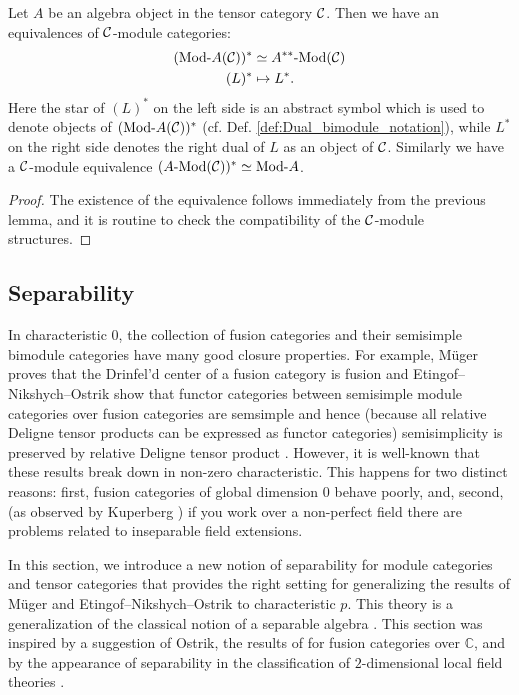 \documentclass{amsart}
\begin{document}
\begin{lemma}
	Let $A$ be an algebra object in the tensor category $\mathcal C$. Then we have an equivalences of $\mathcal C$-module categories: 
	\begin{align*}
		(\Mod{}{A}(\cC))^* & \simeq \Mod{A^{**}}{}(\cC) \\
		(L)^* & \mapsto L^*.
	\end{align*}
	Here the star of $(L)^*$ on the left side is an abstract symbol which is used to denote objects of $(\Mod{}{A}(\cC))^*$ (cf. Def. \ref{def:Dual_bimodule_notation}), while $L^*$ on the right side denotes the right dual of $L$ as an object of $\mathcal C$. Similarly we have a $\mathcal C$-module equivalence $(\Mod{A}{}(\cC))^* \simeq \Mod{}{A}$.	
\end{lemma}

\begin{proof}
	The existence of the equivalence follows immediately from the previous lemma, and it is routine to check the compatibility of the $\mathcal C$-module structures.  
\end{proof}



\subsection{Separability} \label{sec:tc-separable}
In characteristic $0$, the collection of fusion categories and their semisimple bimodule categories have many good closure properties.  For example, M\"uger proves that the Drinfel'd center  of a fusion category is fusion \cite[Theorem 3.16]{MR1966525} and Etingof--Nikshych--Ostrik show that functor categories between semisimple module categories over fusion categories are semsimple and hence (because all relative Deligne tensor products can be expressed as functor categories) semisimplicity is preserved by relative Deligne tensor product \cite[Theorem 2.16]{MR2183279}.  However, it is well-known that these results break down in non-zero characteristic.  This happens for two distinct reasons: first, fusion categories of global dimension $0$ behave poorly, and, second, (as observed by Kuperberg \cite[Question 5.1]{MR1995781}) if you work over a non-perfect field there are problems related to inseparable field extensions.

In this section, we introduce a new notion of separability for module categories and tensor categories that provides the right setting for generalizing the results of M\"uger and Etingof--Nikshych--Ostrik to characteristic $p$.  This theory is a generalization of the classical notion of a separable algebra \cite{???}.   This section was inspired by a suggestion of Ostrik, the results of \cite[\S 2.4]{1009.2117} for fusion categories over $\mathbb{C}$, and by the appearance of separability in the classification of $2$-dimensional local field theories \cite{schommer-pries-thesis}.
\end{document}
